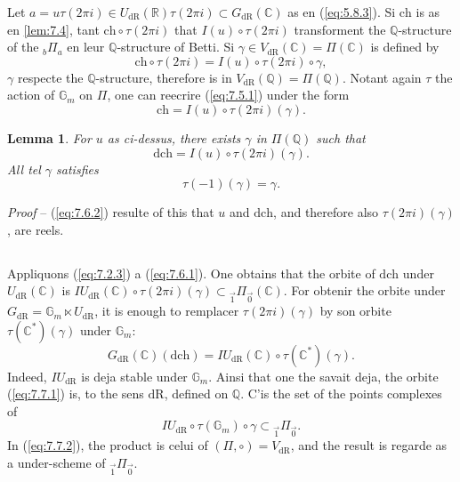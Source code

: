 \documentclass[11pt,a4paper]{article}
\theoremstyle{plain}
\newtheorem{lemma}[theorem]{Lemma}
\theoremstyle{definition}
\newcommand{\Q}{\mathbb{Q}}
\newcommand{\R}{\mathbb{R}}
\newcommand{\C}{\mathbb{C}}
\newcommand{\Gm}{\mathbb{G}_m}
\newcommand{\dR}{\mathrm{dR}}
\begin{document}
Let $a = u \tau(2\pi i) \in U_{\dR}(\R) \tau(2\pi i) \subset G_{\dR}(\C)$ as en (\ref{eq:5.8.3}). Si $\mathrm{ch}$ is as en \ref{lem:7.4}, tant $\mathrm{ch} \circ \tau(2\pi i)$ that $I(u) \circ \tau(2\pi i)$ transforment the $\Q$-structure of the ${}_b\Pi_a$ en leur $\Q$-structure of Betti. Si $\gamma \in V_{\dR}(\C) = \Pi(\C)$ is defined by
\begin{equation}\label{eq:7.5.1}
\mathrm{ch} \circ \tau(2\pi i) = I(u) \circ \tau(2\pi i) \circ \gamma,
\end{equation}
$\gamma$ respecte the $\Q$-structure, therefore is in $V_{\dR}(\Q) = \Pi(\Q)$. Notant again $\tau$ the action of $\Gm$ on $\Pi$, one can reecrire (\ref{eq:7.5.1}) under the form
\begin{equation}\label{eq:7.6.1}
\mathrm{ch} = I(u) \circ \tau(2\pi i)(\gamma).
\end{equation}

\begin{lemma}\label{lem:7.6}
For $u$ as ci-dessus, there exists $\gamma$ in $\Pi(\Q)$ such that
\begin{equation}
\mathrm{dch} = I(u) \circ \tau(2\pi i)(\gamma).
\end{equation}
All tel $\gamma$ satisfies
\begin{equation}\label{eq:7.6.2}
\tau(-1)(\gamma) = \gamma.
\end{equation}
\end{lemma}

\noindent \textit{Proof} -- (\ref{eq:7.6.2}) resulte of this that $u$ and $\mathrm{dch}$, and therefore also $\tau(2\pi i)(\gamma)$, are reels.

\subsection{}\label{ssec:7.7}

Appliquons (\ref{eq:7.2.3}) a (\ref{eq:7.6.1}). One obtains that the orbite of $\mathrm{dch}$ under $U_{\dR}(\C)$ is $IU_{\dR}(\C) \circ \tau(2\pi i)(\gamma) \subset {}_{\vec{1}}\Pi_{\vec{0}}(\C)$. For obtenir the orbite under $G_{\dR} = \Gm \ltimes U_{\dR}$, it is enough to remplacer $\tau(2\pi i)(\gamma)$ by son orbite $\tau(\C^*)(\gamma)$ under $\Gm$:
\begin{equation}\label{eq:7.7.1}
G_{\dR}(\C)(\mathrm{dch}) = IU_{\dR}(\C) \circ \tau(\C^*)(\gamma).
\end{equation}
Indeed, $IU_{\dR}$ is deja stable under $\Gm$. Ainsi that one the savait deja, the orbite (\ref{eq:7.7.1}) is, to the sens $\dR$, defined on $\Q$. C'is the set of the points complexes of
\begin{equation}\label{eq:7.7.2}
IU_{\dR} \circ \tau(\Gm) \circ \gamma \subset {}_{\vec{1}}\Pi_{\vec{0}}.
\end{equation}
In (\ref{eq:7.7.2}), the product is celui of $(\Pi, \circ) = V_{\dR}$, and the result is regarde as a under-scheme of ${}_{\vec{1}}\Pi_{\vec{0}}$.
\end{document}
